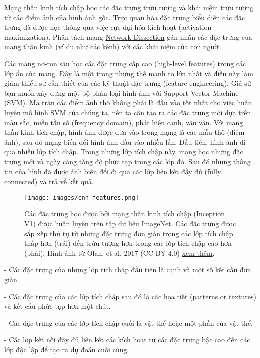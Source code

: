 Mạng thần kinh tích chập học các đặc trưng trừu tượng và khái niệm trừu tượng từ các điểm ảnh của hình ảnh gốc. Trực quan hóa đặc trưng biểu diễn các đặc trưng đã được học thông qua việc cực đại hóa kích hoạt (activation maximization). Phân tách mạng \href{https://christophm.github.io/interpretable-ml-book/cnn-features.html#network-dissection}{Network Dissection} gán nhãn các đặc trưng của mạng thần kinh (ví dụ như các kênh) với các khái niệm của con người.

Các mạng nơ-ron sâu học các đặc trưng cấp cao (high-level features) trong các lớp ẩn của mạng. Đây là một trong những thế mạnh to lớn nhất và điều này làm giảm thiểu sự cần thiết của các kỹ thuật đặc trưng (feature engineering). Giả sử bạn muốn xây dựng một bộ phân loại hình ảnh với Support Vector Machine (SVM). Ma trận các điểm ảnh thô không phải là đầu vào tốt nhất cho việc huấn luyện mô hình SVM của chúng ta, nên ta cần tạo ra các đặc trưng mới dựa trên màu sắc, miền tần số (frequency domain), phát hiện cạnh, vân vân. Với mạng thần kinh tích chập, hình ảnh được đưa vào trong mạng là các mẫu thô (điểm ảnh), sau đó mạng biến đổi hình ảnh đầu vào nhiều lần. Đầu tiên, hình ảnh đi qua nhiều lớp tích chập. Trong những lớp tích chập này, mạng học những đặc trưng mới và ngày càng tăng độ phức tạp trong các lớp đó. Sau đó những thông tin của hình đã được ảnh biến đổi đi qua các lớp liên kết đầy đủ (fully connected) và trả về kết quả.

\newpage

\begin{figure*}[h!]
	\centering
	\texttt{[image: images/cnn-features.png]}
	\label{fig:7_1}
	\caption{Các đặc trưng học được bởi mạng thần kinh tích chập (Inception V1) được huấn luyện trên tập dữ liệu ImageNet. Các đặc trưng được sắp xếp thứ tự từ những đặc trưng đơn giản trong các lớp tích chập thấp hơn (trái) đến trừu tượng hơn trong các lớp tích chập cao hơn (phải). Hình ảnh từ Olah, et al. 2017 (CC-BY 4.0) \href{https://distill.pub/2017/feature-visualization/appendix/}{xem thêm}.}
\end{figure*}

- Các đặc trưng của những lớp tích chập đầu tiên là cạnh và một số kết cấu đơn giản. 

- Các đặc trưng của các lớp tích chập sau đó là các họa tiết (patterns or textures) và kết cấu phức tạp hơn một chút.

- Các đặc trưng của các lớp tích chập cuối là vật thể hoặc một phần của vật thể.

- Các lớp kết nối đầy đủ liên kết các kích hoạt từ các đặc trưng bậc cao đến các lớp độc lập để tạo ra dự đoán cuối cùng.

